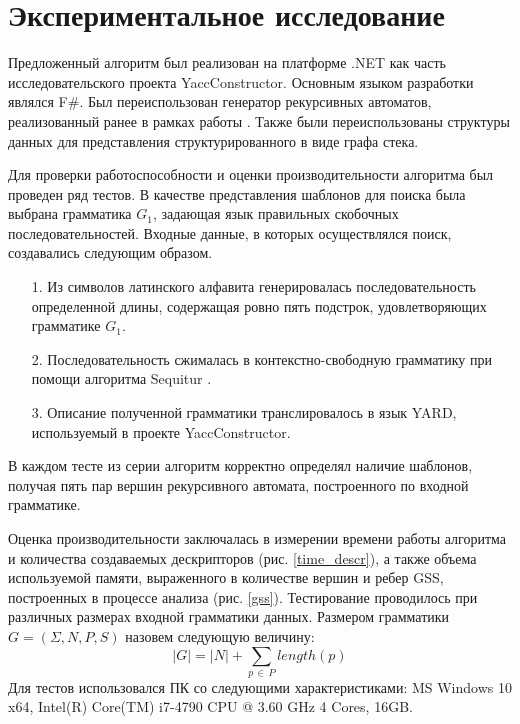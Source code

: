 \section{Экспериментальное исследование}

Предложенный алгоритм был реализован на платформе .NET как часть исследовательского проекта YaccConstructor. Основным языком разработки являлся F$\#$. Был переиспользован генератор рекурсивных автоматов, реализованный ранее в рамках работы \cite{Gorokhov2017ebnf}. Также были переиспользованы структуры данных для представления структурированного в виде графа стека.

Для проверки работоспособности и оценки производительности алгоритма был проведен ряд тестов. В качестве представления шаблонов для поиска была выбрана грамматика $G_1$, задающая язык правильных скобочных последовательностей. Входные данные, в которых осуществлялся поиск, создавались следующим образом.
\begin{itemize}
	\item[1.] Из символов латинского алфавита генерировалась последовательность определенной длины, содержащая ровно пять подстрок, удовлетворяющих грамматике $G_1$.
	\item[2.] Последовательность сжималась в контекстно-свободную грамматику при помощи алгоритма Sequitur \cite{sequitur, sequitur_url}.
	\item[3.] Описание полученной грамматики транслировалось в язык YARD, используемый в проекте YaccConstructor.
\end{itemize}
В каждом тесте из серии алгоритм корректно определял наличие шаблонов, получая пять пар вершин рекурсивного автомата, построенного по входной  грамматике. 

Оценка производительности заключалась в измерении времени работы алгоритма и количества создаваемых дескрипторов (рис. \ref{time_descr}), а также объема используемой памяти, выраженного в количестве вершин и ребер GSS, построенных в процессе анализа (рис. \ref{gss}). Тестирование проводилось при различных размерах входной грамматики данных. Размером грамматики $G = (\Sigma, N, P, S)$ назовем следующую величину:
$$|G| = |N| + \sum_{p \, \in \, P} length(p)$$ 
Для тестов использовался ПК со следующими характеристиками: \linebreak MS Windows 10 x64, Intel(R) Core(TM) i7-4790 CPU @ 3.60 GHz 4 Cores, 16GB.

